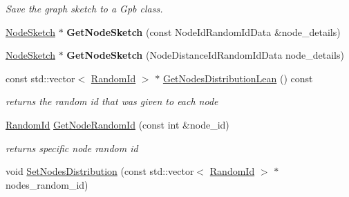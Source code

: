 \begin{DoxyCompactItemize}
\begin{DoxyCompactList}\small\item\em Save the graph sketch to a Gpb class. \end{DoxyCompactList}\item 
\hypertarget{classall__distance__sketch_1_1GraphSketch_ad0b0931712a19b47983a24ef73500316}{}\hyperlink{classall__distance__sketch_1_1NodeSketch}{Node\+Sketch} $\ast$ {\bfseries Get\+Node\+Sketch} (const Node\+Id\+Random\+Id\+Data \&node\+\_\+details)\label{classall__distance__sketch_1_1GraphSketch_ad0b0931712a19b47983a24ef73500316}

\item 
\hypertarget{classall__distance__sketch_1_1GraphSketch_a696af8492f42fbbb60afbc2ff2a68a96}{}\hyperlink{classall__distance__sketch_1_1NodeSketch}{Node\+Sketch} $\ast$ {\bfseries Get\+Node\+Sketch} (Node\+Distance\+Id\+Random\+Id\+Data node\+\_\+details)\label{classall__distance__sketch_1_1GraphSketch_a696af8492f42fbbb60afbc2ff2a68a96}

\item 
\hypertarget{classall__distance__sketch_1_1GraphSketch_af463db872f2cc5cc635dffe4aaf136e6}{}const std\+::vector$<$ \hyperlink{namespaceall__distance__sketch_a07dc7ca615a83c4e656f52297eda4bb4}{Random\+Id} $>$ $\ast$ \hyperlink{classall__distance__sketch_1_1GraphSketch_af463db872f2cc5cc635dffe4aaf136e6}{Get\+Nodes\+Distribution\+Lean} () const \label{classall__distance__sketch_1_1GraphSketch_af463db872f2cc5cc635dffe4aaf136e6}

\begin{DoxyCompactList}\small\item\em returns the random id that was given to each node \end{DoxyCompactList}\item 
\hypertarget{classall__distance__sketch_1_1GraphSketch_af9bbe3a02d29880b7218c52b53375e31}{}\hyperlink{namespaceall__distance__sketch_a07dc7ca615a83c4e656f52297eda4bb4}{Random\+Id} \hyperlink{classall__distance__sketch_1_1GraphSketch_af9bbe3a02d29880b7218c52b53375e31}{Get\+Node\+Random\+Id} (const int \&node\+\_\+id)\label{classall__distance__sketch_1_1GraphSketch_af9bbe3a02d29880b7218c52b53375e31}

\begin{DoxyCompactList}\small\item\em returns specific node random id \end{DoxyCompactList}\item 
\hypertarget{classall__distance__sketch_1_1GraphSketch_af57117f7a70b714dedc882d8f213207c}{}void \hyperlink{classall__distance__sketch_1_1GraphSketch_af57117f7a70b714dedc882d8f213207c}{Set\+Nodes\+Distribution} (const std\+::vector$<$ \hyperlink{namespaceall__distance__sketch_a07dc7ca615a83c4e656f52297eda4bb4}{Random\+Id} $>$ $\ast$nodes\+\_\+random\+\_\+id)\label{classall__distance__sketch_1_1GraphSketch_af57117f7a70b714dedc882d8f213207c}


\end{DoxyCompactItemize}
